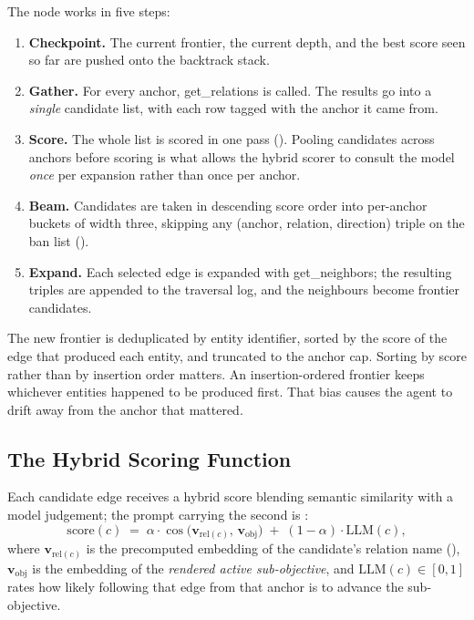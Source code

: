 The node works in five steps:

\begin{enumerate}
  \item \textbf{Checkpoint.} The current frontier, the current depth, and the
  best score seen so far are pushed onto the backtrack stack.
  \item \textbf{Gather.} For every anchor, \textsf{get\_relations} is called.
  The results go into a \emph{single} candidate list, with each row tagged with
  the anchor it came from.
  \item \textbf{Score.} The whole list is scored in one pass
  (). Pooling candidates across anchors before scoring is what
  allows the hybrid scorer to consult the model \emph{once} per expansion rather
  than once per anchor.
  \item \textbf{Beam.} Candidates are taken in descending score order into
  per-anchor buckets of width three, skipping any \textsf{(anchor, relation,
  direction)} triple on the ban list ().
  \item \textbf{Expand.} Each selected edge is expanded with
  \textsf{get\_neighbors}; the resulting triples are appended to the traversal
  log, and the neighbours become frontier candidates.
\end{enumerate}

The new frontier is deduplicated by entity identifier, sorted by the score of
the edge that produced each entity, and truncated to the anchor cap. Sorting by
score rather than by insertion order matters. An insertion-ordered frontier
keeps whichever entities happened to be produced first. That bias causes the
agent to drift away from the anchor that mattered.

\subsection{The Hybrid Scoring Function}\label{sec:scoring}

Each candidate edge receives a hybrid score
blending semantic similarity with a model judgement; the prompt carrying the
second is : \[ \mathrm{score}(c) \;=\; \alpha \cdot
\cos\!\big(\mathbf{v}_{\mathrm{rel}(c)},\, \mathbf{v}_{\mathrm{obj}}\big) \;+\;
(1-\alpha)\cdot \mathrm{LLM}(c), \] where $\mathbf{v}_{\mathrm{rel}(c)}$ is the
precomputed embedding of the candidate's relation name
(), $\mathbf{v}_{\mathrm{obj}}$ is the embedding of the
\emph{rendered active sub-objective}, and $\mathrm{LLM}(c) \in [0,1]$ rates how
likely following that edge from that anchor is to advance the sub-objective.

